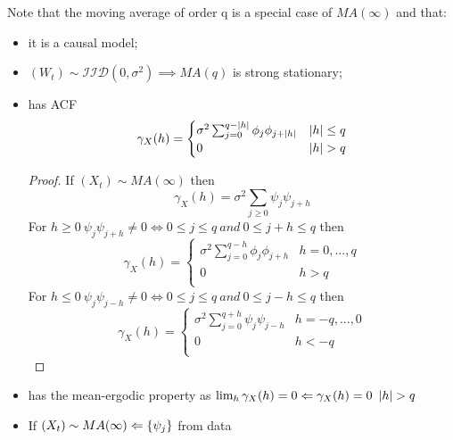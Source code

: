 Note that the moving average of order q is a special case of $MA(\infty)$ and that:
\begin{itemize}
    \item it is a causal model; 
    \item $(W_t)\sim\mathcal{IID}(0,\sigma^2)\implies MA(q)$ is strong stationary;
    \item has ACF
    \[
        \gamma_X(h)=\begin{cases}
                \sigma^2\sum_{j=0}^{q-\abs{h}}\phi_j\phi_{j+\abs{h}}&\abs{h}\le q\\
                0&\abs{h}>q
        \end{cases}  
    \]
    \begin{proof}
        If $(X_t)\sim MA(\infty)$ then
        \[
            \gamma_X(h)=\sigma^2\sum_{j\ge0}\psi_j\psi_{j+h}  
        \]
        For $h\ge0\ \psi_j\psi_{j+h}\ne0\iff0\le j\le q\ and\ 0\le j+h\le q$ then
        \[
            \gamma_X(h)=\begin{cases}
                \sigma^2\sum_{j=0}^{q-h}\phi_j\phi_{j+h}&h=0,...,q\\
                0&h>q\\
            \end{cases}  
        \]
        For $h\le0\ \psi_j\psi_{j-h}\ne0\iff0\le j\le q\ and\ 0\le j-h\le q$ then
        \[
            \gamma_X(h)=\begin{cases}
                \sigma^2\sum_{j=0}^{q+h}\psi_j\psi_{j-h}&h=-q,...,0\\
                0&h<-q\\
            \end{cases}  
        \]
    \end{proof}
    \item has the mean-ergodic property as $\lim_h \gamma_X(h)=0\Leftarrow\gamma_X(h)=0\ \abs{h}>q$
    \item If $(X_t)\sim MA(\infty)\Leftarrow\left\{\psi_j\right\}$ from data
\end{itemize}

